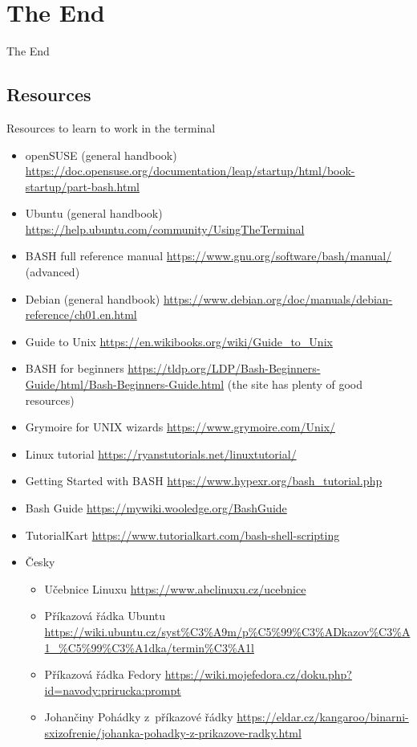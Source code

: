 \documentclass[compress, xelatex, 11pt, xcolor=svgnames, aspectratio=169,
	hyperref={
		bookmarks=true,
		unicode=true,
		colorlinks=true,
		pdftitle={Linux, command line and MetaCentrum},
		plainpages=false,
		pdfauthor={Vojtech Zeisek},
		pdfsubject={Course about use of Linux command line, writing shell scripts and using MetaCentrum of CESNET},
		pdfcreator={XeLaTeX},
		pdfkeywords={Linux, GNU, BASH, shell, command line, MetaCentrum},
		linkcolor=DarkRed, %
		anchorcolor=DarkBlue, %
		citecolor=Indigo, %
		filecolor=NavyBlue, %
		menucolor=DarkMagenta, %
		urlcolor=DarkBlue, %
		},
	url={hyphens, lowtilde} %
	]{beamer}
\begin{document}
\section{The End}

\begin{frame}{The End}
	\tableofcontents[currentsection, sectionstyle=show/hide, hideothersubsections]
\end{frame}

\subsection{Resources}

\begin{frame}[allowframebreaks]{Resources to learn to work in the terminal}
	\begin{itemize}
		\item openSUSE (general handbook) \url{https://doc.opensuse.org/documentation/leap/startup/html/book-startup/part-bash.html}
		\item Ubuntu (general handbook) \url{https://help.ubuntu.com/community/UsingTheTerminal}
		\item BASH full reference manual \url{https://www.gnu.org/software/bash/manual/} (advanced)
		\item Debian (general handbook) \url{https://www.debian.org/doc/manuals/debian-reference/ch01.en.html}
		\item Guide to Unix \url{https://en.wikibooks.org/wiki/Guide_to_Unix}
		\item BASH for beginners \url{https://tldp.org/LDP/Bash-Beginners-Guide/html/Bash-Beginners-Guide.html} (the site has plenty of good resources)
		\item Grymoire for UNIX wizards \url{https://www.grymoire.com/Unix/}
		\item Linux tutorial \url{https://ryanstutorials.net/linuxtutorial/}
		\item Getting Started with BASH \url{https://www.hypexr.org/bash_tutorial.php}
		\item Bash Guide \url{https://mywiki.wooledge.org/BashGuide}
		\item TutorialKart \url{https://www.tutorialkart.com/bash-shell-scripting}
		\item Česky
		\begin{itemize}
			\item Učebnice Linuxu \url{https://www.abclinuxu.cz/ucebnice}
			\item Příkazová řádka Ubuntu \url{https://wiki.ubuntu.cz/syst\%C3\%A9m/p\%C5\%99\%C3\%ADkazov\%C3\%A1_\%C5\%99\%C3\%A1dka/termin\%C3\%A1l}
			\item Příkazová řádka Fedory \url{https://wiki.mojefedora.cz/doku.php?id=navody:prirucka:prompt}
			\item Johančiny Pohádky z~příkazové řádky \url{https://eldar.cz/kangaroo/binarni-sxizofrenie/johanka-pohadky-z-prikazove-radky.html}
		\end{itemize}
	\end{itemize}
\end{frame}
\end{document}
